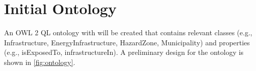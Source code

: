 \documentclass[11pt,a4paper,twocolumn]{article}
\theoremstyle{plain}
\theoremstyle{definition}
\theoremstyle{remark}
\begin{document}
\section{Initial Ontology} \label{technology}

An OWL 2 QL ontology with will be created that contains relevant classes (e.g., Infrastructure, EnergyInfrastructure, HazardZone, Municipality) and properties (e.g., isExposedTo, infrastructureIn). A preliminary design for the ontology is shown in \cref{fig:ontology}.
\end{document}
